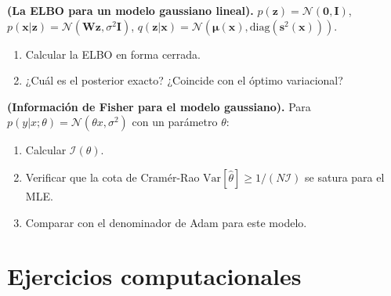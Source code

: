 \begin{ejercicio}
\textbf{(La ELBO para un modelo gaussiano lineal).}
$p(\bm{z}) = \mathcal{N}(\bm{0},\bm{I})$,
$p(\bm{x}|\bm{z}) = \mathcal{N}(\bm{W}\bm{z},\sigma^2\bm{I})$,
$q(\bm{z}|\bm{x}) = \mathcal{N}(\bm{\mu}(\bm{x}),
\text{diag}(\bm{s}^2(\bm{x})))$.
\begin{enumerate}[label=(\alph*)]
  \item Calcular la ELBO en forma cerrada.
  \item ¿Cuál es el posterior exacto? ¿Coincide con el óptimo variacional?
\end{enumerate}
\end{ejercicio}

\begin{ejercicio}
\textbf{(Información de Fisher para el modelo gaussiano).}
Para $p(y|x;\theta) = \mathcal{N}(\theta x, \sigma^2)$ con un parámetro
$\theta$:
\begin{enumerate}[label=(\alph*)]
  \item Calcular $\mathcal{I}(\theta)$.
  \item Verificar que la cota de Cramér-Rao
        $\text{Var}[\hat{\theta}] \geq 1/(N\mathcal{I})$ se satura para
        el MLE.
  \item Comparar con el denominador de Adam para este modelo.
\end{enumerate}
\end{ejercicio}

\section*{Ejercicios computacionales}

